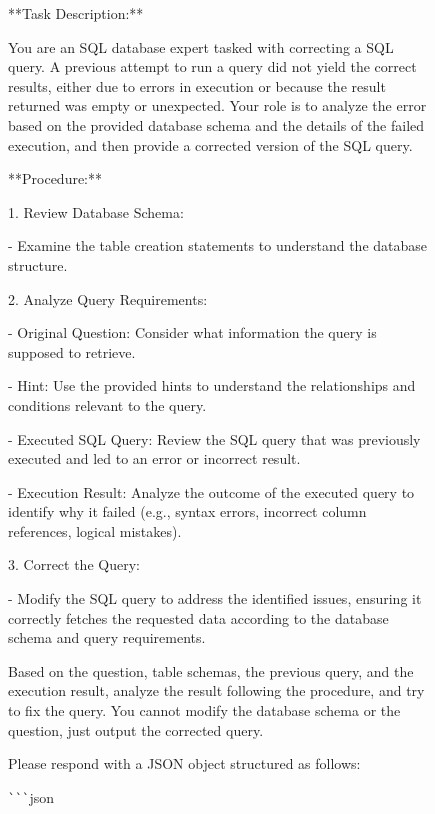\begin{figure}[t!]
    \centering
    \begin{tcolorbox}[
        title=SQL Revision Action Prompt,
        colback=white,        %
        colframe=blue!75!black,  %
        fonttitle=\bfseries,    %
    ]

**Task Description:**

You are an SQL database expert tasked with correcting a SQL query. A previous attempt to run a query did not yield the correct results, either due to errors in execution or because the result returned was empty or unexpected. Your role is to analyze the error based on the provided database schema and the details of the failed execution, and then provide a corrected version of the SQL query.

**Procedure:**

1. Review Database Schema:

	- Examine the table creation statements to understand the database structure.
    
2. Analyze Query Requirements:

	- Original Question: Consider what information the query is supposed to retrieve.
    
	- Hint: Use the provided hints to understand the relationships and conditions relevant to the query.
    
	- Executed SQL Query: Review the SQL query that was previously executed and led to an error or incorrect result.
    
	- Execution Result: Analyze the outcome of the executed query to identify why it failed (e.g., syntax errors, incorrect column references, logical mistakes).
    
3. Correct the Query: 

	- Modify the SQL query to address the identified issues, ensuring it correctly fetches the requested data according to the database schema and query requirements.

\vspace{1em}
Based on the question, table schemas, the previous query, and the execution result, analyze the result following the procedure, and try to fix the query.
You cannot modify the database schema or the question, just output the corrected query.

Please respond with a JSON object structured as follows:

\verb|```|json


\end{tcolorbox}
\end{figure}
